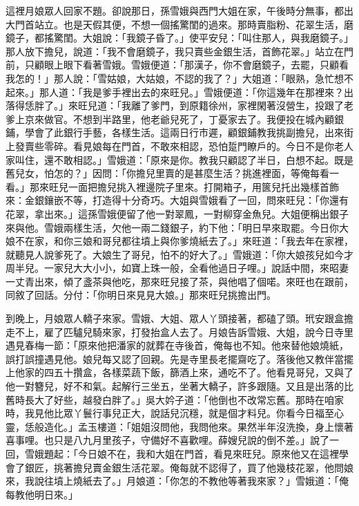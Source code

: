這裡月娘眾人回家不題。卻說那日，孫雪娥與西門大姐在家，午後時分無事，都出大門首站立。也是天假其便，不想一個搖驚閨的過來。那時賣脂粉、花翠生活，磨鏡子，都搖驚閨。大姐說：「我鏡子昏了。」使平安兒：「叫住那人，與我磨鏡子。」那人放下擔兒，說道：「我不會磨鏡子，我只賣些金銀生活，首飾花翠。」站立在門前，只顧眼上眼下看著雪娥。雪娥便道：「那漢子，你不會磨鏡子，去罷，只顧看我怎的！」那人說：「雪姑娘，大姑娘，不認的我了？」大姐道：「眼熟，急忙想不起來。」那人道：「我是爹手裡出去的來旺兒。」雪娥便道：「你這幾年在那裡來？出落得恁胖了。」來旺兒道：「我離了爹門，到原籍徐州，家裡閑著沒營生，投跟了老爹上京來做官。不想到半路里，他老爺兒死了，丁憂家去了。我便投在城內顧銀鋪，學會了此銀行手藝，各樣生活。這兩日行市遲，顧銀鋪教我挑副擔兒，出來街上發賣些零碎。看見娘每在門首，不敢來相認，恐怕踅門瞭戶的。今日不是你老人家叫住，還不敢相認。」雪娥道：「原來是你。教我只顧認了半日，白想不起。既是舊兒女，怕怎的？」因問：「你擔兒里賣的是甚麼生活？挑進裡面，等俺每看一看。」那來旺兒一面把擔兒挑入裡邊院子里來。打開箱子，用篋兒托出幾樣首飾來：金銀鑲嵌不等，打造得十分奇巧。大姐與雪娥看了一回，問來旺兒：「你還有花翠，拿出來。」這孫雪娥便留了他一對翠鳳，一對柳穿金魚兒。大姐便稱出銀子來與他。雪娥兩樣生活，欠他一兩二錢銀子，約下他：「明日早來取罷。今日你大娘不在家，和你三娘和哥兒都往墳上與你爹燒紙去了。」來旺道：「我去年在家裡，就聽見人說爹死了。大娘生了哥兒，怕不的好大了。」雪娥道：「你大娘孩兒如今才周半兒。一家兒大大小小，如寶上珠一般，全看他過日子哩。」說話中間，來昭妻一丈青出來，傾了盞茶與他吃，那來旺兒接了茶，與他唱了個喏。來旺也在跟前，同敘了回話。分付：「你明日來見見大娘。」那來旺兒挑擔出門。

到晚上，月娘眾人轎子來家。雪娥、大姐、眾人丫頭接著，都磕了頭。玳安跟盒擔走不上，雇了匹驢兒騎來家，打發抬盒人去了。月娘告訴雪娥、大姐，說今日寺里遇見春梅一節：「原來他把潘家的就葬在寺後首，俺每也不知。他來替他娘燒紙，誤打誤撞遇見他。娘兒每又認了回親。先是寺里長老擺齋吃了。落後他又教伴當擺上他家的四五十攢盒，各樣菜蔬下飯，篩酒上來，通吃不了。他看見哥兒，又與了他一對簪兒，好不和氣。起解行三坐五，坐著大轎子，許多跟隨。又且是出落的比舊時長大了好些，越發白胖了。」吳大妗子道：「他倒也不改常忘舊。那時在咱家時，我見他比眾丫鬟行事兒正大，說話兒沉穩，就是個才料兒。你看今日福至心靈，恁般造化。」孟玉樓道：「姐姐沒問他，我問他來。果然半年沒洗換，身上懷著喜事哩。也只是八九月里孩子，守備好不喜歡哩。薛嫂兒說的倒不差。」說了一回，雪娥題起：「今日娘不在，我和大姐在門首，看見來旺兒。原來他又在這裡學會了銀匠，挑著擔兒賣金銀生活花翠。俺每就不認得了，買了他幾枝花翠，他問娘來，我說往墳上燒紙去了。」月娘道：「你怎的不教他等著我來家？」雪娥道：「俺每教他明日來。」

